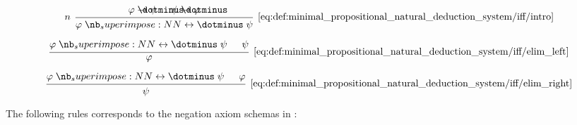 \begin{definition}
\begin{thmenum}
    \begin{minipage}{0.3\textwidth}
      \begin{equation*}\taglabel[\( \leftrightarrow^+ \)]{eq:def:minimal_propositional_natural_deduction_system/iff/intro}
        \begin{prooftree}
          \hypo{ \varphi \synimplies \psi }
          \hypo{ \psi \synimplies \varphi }
          \infer[left label=\( n \)]2[\ref{eq:def:minimal_propositional_natural_deduction_system/iff/intro}]{ \varphi \syniff \psi }
        \end{prooftree}
      \end{equation*}
    \end{minipage}
    \hfill
    \begin{minipage}{0.3\textwidth}
      \begin{equation*}\taglabel[\( \leftrightarrow^{-_L} \)]{eq:def:minimal_propositional_natural_deduction_system/iff/elim_left}
        \begin{prooftree}
          \hypo{ \varphi \syniff \psi }
          \hypo{ \psi }
          \infer2[\ref{eq:def:minimal_propositional_natural_deduction_system/iff/elim_left}]{ \varphi }
        \end{prooftree}
      \end{equation*}
    \end{minipage}
    \hfill
    \begin{minipage}{0.3\textwidth}
      \begin{equation*}\taglabel[\( \leftrightarrow^{-_R} \)]{eq:def:minimal_propositional_natural_deduction_system/iff/elim_right}
        \begin{prooftree}
          \hypo{ \varphi \syniff \psi }
          \hypo{ \varphi }
          \infer2[\ref{eq:def:minimal_propositional_natural_deduction_system/iff/elim_right}]{ \psi }
        \end{prooftree}
      \end{equation*}
    \end{minipage}

     The following rules corresponds to the negation axiom schemas in :


\end{thmenum}
\end{definition}
